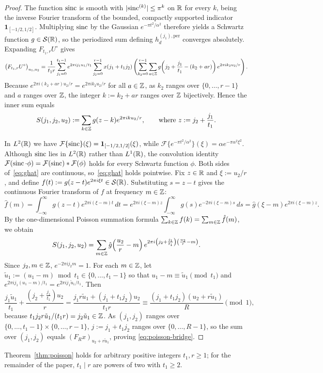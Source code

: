 \begin{proof}
The function $\operatorname{sinc}$ is smooth with $\lvert\operatorname{sinc}^{(k)}\rvert \le \pi^k$ on $\mathbb{R}$ for every $k$, being the inverse Fourier transform of the bounded, compactly supported indicator $\mathbf{1}_{[-1/2,1/2]}$. Multiplying $\operatorname{sinc}$ by the Gaussian $e^{-\pi t^2/\alpha^2}$ therefore yields a Schwartz function $g \in \mathcal{S}(\mathbb{R})$, so the periodized sum defining $h^{(j_1),\mathrm{per}}_d$ converges absolutely. Expanding $F_{t_1, r} U^\circ$ gives
\[
  \bigl(F_{t_1, r} U^\circ\bigr)_{u_1, u_2} = \frac{1}{t_1 r} \sum_{j_1=0}^{t_1-1} e^{2\pi i j_1 u_1 / t_1} \sum_{j_2=0}^{r-1} x(j_1 + t_1 j_2) \left(\sum_{k_2=0}^{r-1} \sum_{a \in \mathbb{Z}} g\!\left(j_2 + \frac{j_1}{t_1} - (k_2 + a r)\right) e^{2\pi i k_2 u_2 / r}\right).
\]
Because $e^{2\pi i (k_2 + a r) u_2 / r} = e^{2\pi i k_2 u_2 / r}$ for all $a \in \mathbb{Z}$, as $k_2$ ranges over $\{0, \dots, r-1\}$ and $a$ ranges over $\mathbb{Z}$, the integer $k := k_2 + a r$ ranges over $\mathbb{Z}$ bijectively. Hence the inner sum equals
\[
  S(j_1, j_2, u_2) := \sum_{k \in \mathbb{Z}} g(z - k) e^{2\pi i k u_2 / r}, \qquad \text{where } z := j_2 + \frac{j_1}{t_1}.
\]

In $L^2(\mathbb{R})$ we have $\mathcal{F}\{\operatorname{sinc}\}(\xi) = \mathbf{1}_{[-1/2, 1/2]}(\xi)$, while $\mathcal{F}\{e^{-\pi t^2 / \alpha^2}\}(\xi) = \alpha e^{-\pi\alpha^2\xi^2}$. Although $\operatorname{sinc}$ lies in $L^2(\mathbb{R})$ rather than $L^1(\mathbb{R})$, the convolution identity $\mathcal{F}(\operatorname{sinc}\cdot\phi) = \mathcal{F}(\operatorname{sinc}) * \mathcal{F}(\phi)$ holds for every Schwartz function $\phi$. Both sides of~\eqref{eq:ghat} are continuous, so~\eqref{eq:ghat} holds pointwise. Fix $z \in \mathbb{R}$ and $\xi := u_2 / r$, and define $f(t) := g(z - t) e^{2\pi i \xi t} \in \mathcal{S}(\mathbb{R})$. Substituting $s = z - t$ gives the continuous Fourier transform of $f$ at frequency $m \in \mathbb{Z}$:
\[
  \hat{f}(m) = \int_{-\infty}^\infty g(z - t) e^{2\pi i (\xi - m) t} \, dt = e^{2\pi i (\xi - m) z} \int_{-\infty}^\infty g(s) e^{-2\pi i (\xi - m) s} \, ds = \hat{g}(\xi - m) e^{2\pi i (\xi - m) z}.
\]
By the one-dimensional Poisson summation formula $\sum_{k \in \mathbb{Z}} f(k) = \sum_{m \in \mathbb{Z}} \hat{f}(m)$, we obtain
\[
  S(j_1, j_2, u_2) = \sum_{m \in \mathbb{Z}} \hat{g}\!\left(\frac{u_2}{r} - m\right) e^{2\pi i \left(j_2 + \frac{j_1}{t_1}\right)\left(\frac{u_2}{r} - m\right)}.
\]
Since $j_2, m \in \mathbb{Z}$, $e^{-2\pi i j_2 m} = 1$. For each $m \in \mathbb{Z}$, let $\tilde{u}_1 := (u_1 - m) \bmod t_1 \in \{0, \dots, t_1-1\}$ so that $u_1 - m \equiv \tilde{u}_1 \pmod{t_1}$ and $e^{2\pi i j_1 (u_1 - m) / t_1} = e^{2\pi i j_1 \tilde{u}_1 / t_1}$. Then
\[
  \frac{j_1 \tilde{u}_1}{t_1} + \frac{\left(j_2 + \frac{j_1}{t_1}\right) u_2}{r} = \frac{j_1 r \tilde{u}_1 + (j_1 + t_1 j_2) u_2}{t_1 r} \equiv \frac{(j_1 + t_1 j_2)(u_2 + r \tilde{u}_1)}{R} \pmod{1},
\]
because $t_1 j_2 r \tilde{u}_1 / (t_1 r) = j_2 \tilde{u}_1 \in \mathbb{Z}$. As $(j_1, j_2)$ ranges over $\{0, \dots, t_1-1\} \times \{0, \dots, r-1\}$, $j := j_1 + t_1 j_2$ ranges over $\{0, \dots, R-1\}$, so the sum over $(j_1, j_2)$ equals $(F_R x)_{u_2 + r \tilde{u}_1}$, proving \eqref{eq:poisson-bridge}.
\end{proof}

Theorem~\ref{thm:poisson} holds for arbitrary positive integers $t_1, r \ge 1$; for the remainder of the paper, $t_1 \mid r$ are powers of two with $t_1 \ge 2$.
